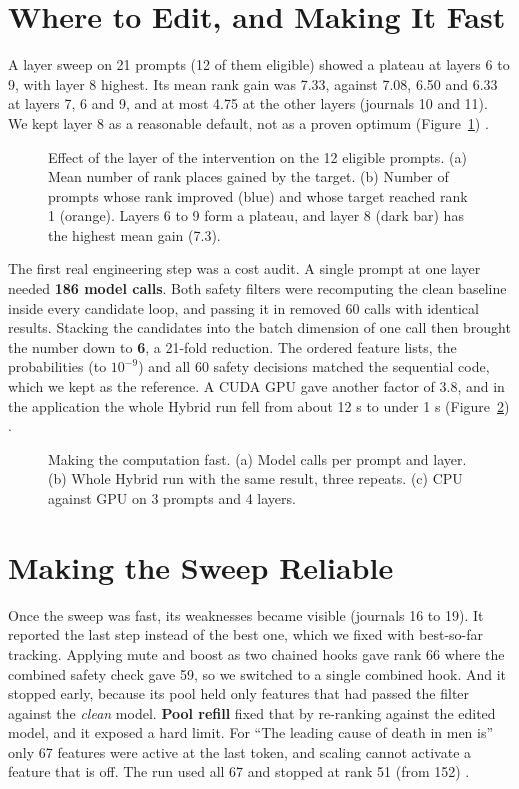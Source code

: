 \section{Where to Edit, and Making It Fast}\label{sec:depth}

A layer sweep on 21 prompts (12 of them eligible) showed a plateau at layers 6 to 9, with layer 8 highest. Its mean rank gain was 7.33, against 7.08, 6.50 and 6.33 at layers 7, 6 and 9, and at most 4.75 at the other layers (journals 10 and 11). We kept layer 8 as a reasonable default, not as a proven optimum (Figure~\ref{fig:layer12}) \cite{p4}.

\begin{figure}[!htb]
\centering
{}
\caption{Effect of the layer of the intervention on the 12 eligible prompts. (a) Mean number of rank places gained by the target. (b) Number of prompts whose rank improved (blue) and whose target reached rank 1 (orange). Layers 6 to 9 form a plateau, and layer 8 (dark bar) has the highest mean gain (7.3).}\label{fig:layer12}
\end{figure}


The first real engineering step was a cost audit. A single prompt at one layer needed \textbf{186 model calls}. Both safety filters were recomputing the clean baseline inside every candidate loop, and passing it in removed 60 calls with identical results. Stacking the candidates into the batch dimension of one call then brought the number down to \textbf{6}, a 21-fold reduction. The ordered feature lists, the probabilities (to $10^{-9}$) and all 60 safety decisions matched the sequential code, which we kept as the reference. A CUDA GPU gave another factor of 3.8, and in the application the whole Hybrid run fell from about 12 s to under 1 s (Figure~\ref{fig:speed}) \cite{p5}.

\begin{figure}[!htb]
\centering
{}
\caption{Making the computation fast. (a) Model calls per prompt and layer. (b) Whole Hybrid run with the same result, three repeats. (c) CPU against GPU on 3 prompts and 4 layers.}\label{fig:speed}
\end{figure}

\section{Making the Sweep Reliable}\label{sec:reliable}

Once the sweep was fast, its weaknesses became visible (journals 16 to 19). It reported the last step instead of the best one, which we fixed with best-so-far tracking. Applying mute and boost as two chained hooks gave rank 66 where the combined safety check gave 59, so we switched to a single combined hook. And it stopped early, because its pool held only features that had passed the filter against the \emph{clean} model. \textbf{Pool refill} fixed that by re-ranking against the edited model, and it exposed a hard limit. For ``The leading cause of death in men is'' only 67 features were active at the last token, and scaling cannot activate a feature that is off. The run used all 67 and stopped at rank 51 (from 152) \cite{p6}.

